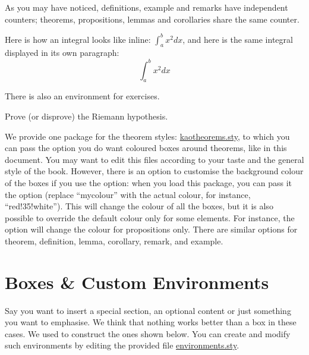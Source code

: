 As you may have noticed, definitions, example and remarks have 
independent counters; theorems, propositions, lemmas and corollaries 
share the same counter.

\begin{remark}
Here is how an integral looks like inline: $\int_{a}^{b} x^2 dx$, and 
here is the same integral displayed in its own paragraph:
\[\int_{a}^{b} x^2 dx\]
\end{remark}

There is also an environment for exercises.

\begin{exercise}
Prove (or disprove) the Riemann hypothesis.
\end{exercise}

We provide one package for the theorem styles: 
\href{kaotheorems.sty}{kaotheorems.sty}, to which you can pass the 
 option you do want coloured boxes around theorems, like 
in this document. You may want to edit this files according to your taste 
and the general style of the book. However, there is an option to 
customise the background colour of the boxes if you use the 
 option: when you load this package, you can pass it the 
 option (replace \enquote{mycolour} with the 
actual colour, for instance, \enquote{red!35!white}). This will change 
the colour of all the boxes, but it is also possible to override the 
default colour only for some elements. For instance, the 
 option will change the colour 
for propositions only. There are similar options for theorem, 
definition, lemma, corollary, remark, and example.

\section[Boxes \& Environments]{Boxes \& Custom Environments
}

Say you want to insert a special section, an optional content or just 
something you want to emphasise. We think that nothing works better than 
a box in these cases. We used  to construct the ones 
shown below. You can create and modify such environments by editing the 
provided file \href{style/environments.sty}{environments.sty}.

